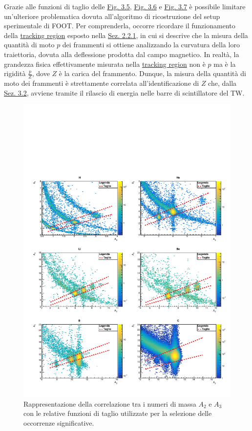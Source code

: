 \documentclass[12pt,a4paper,twoside]{report}
\begin{document}
	Grazie alle funzioni di taglio delle \hyperref[fig:a1_cut]{Fig. 3.5}, \hyperref[fig:a2_cut]{Fig. 3.6} e \hyperref[fig:a3_cut]{Fig. 3.7} è possibile limitare un'ulteriore problematica dovuta all'algoritmo di ricostruzione del setup sperimentale di FOOT. Per comprenderla, occorre ricordare il funzionamento della \hyperref[par:tracking_region]{tracking region} esposto nella \hyperref[sec:setupElettronico]{Sez. 2.2.1}, in cui si descrive che la misura della quantità di moto $p$ dei frammenti si ottiene analizzando la curvatura della loro traiettoria, dovuta alla deflessione prodotta dal campo magnetico. In realtà, la grandezza fisica effettivamente misurata nella \hyperref[par:tracking_region]{tracking region} non è $p$ ma è la rigidità $\frac{p}{Z}$, dove $Z$ è la carica del frammento. Dunque, la misura della quantità di moto dei frammenti è strettamente correlata all'identificazione di $Z$ che, dalla \hyperref[sec:atomic_number_identification]{Sez. 3.2}, avviene tramite il rilascio di energia nelle barre di scintillatore del TW.
	\begin{figure}[H]
		\centering
		\includegraphics[width=.95\linewidth]{c_MultiCanvasCutLog3.pdf}
		\caption{Rappresentazione della correlazione tra i numeri di massa $A_2$ e $A_3$ con le relative funzioni di taglio utilizzate per la selezione delle occorrenze significative.}
		\label{fig:a3_cut}
	\end{figure}
\end{document}
